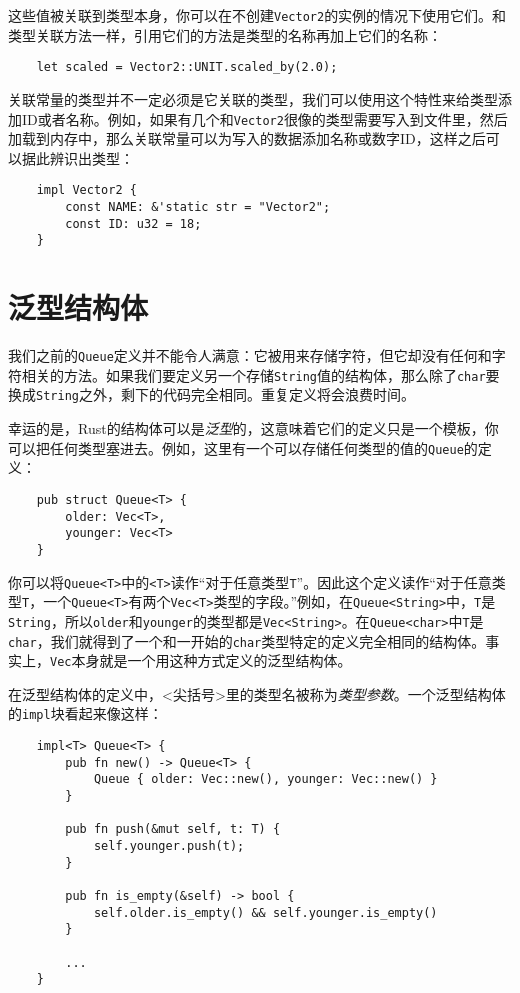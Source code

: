 这些值被关联到类型本身，你可以在不创建\texttt{Vector2}的实例的情况下使用它们。和类型关联方法一样，引用它们的方法是类型的名称再加上它们的名称：
\begin{verbatim}
    let scaled = Vector2::UNIT.scaled_by(2.0);
\end{verbatim}

关联常量的类型并不一定必须是它关联的类型，我们可以使用这个特性来给类型添加ID或者名称。例如，如果有几个和\texttt{Vector2}很像的类型需要写入到文件里，然后加载到内存中，那么关联常量可以为写入的数据添加名称或数字ID，这样之后可以据此辨识出类型：
\begin{verbatim}
    impl Vector2 {
        const NAME: &'static str = "Vector2";
        const ID: u32 = 18;
    }
\end{verbatim}

\section{泛型结构体}\label{GenStruct}

我们之前的\texttt{Queue}定义并不能令人满意：它被用来存储字符，但它却没有任何和字符相关的方法。如果我们要定义另一个存储\texttt{String}值的结构体，那么除了\texttt{char}要换成\texttt{String}之外，剩下的代码完全相同。重复定义将会浪费时间。

幸运的是，Rust的结构体可以是\emph{泛型}的，这意味着它们的定义只是一个模板，你可以把任何类型塞进去。例如，这里有一个可以存储任何类型的值的\texttt{Queue}的定义：
\begin{verbatim}
    pub struct Queue<T> {
        older: Vec<T>,
        younger: Vec<T>
    }
\end{verbatim}

你可以将\texttt{Queue<T>}中的\texttt{<T>}读作“对于任意类型\texttt{T}”。因此这个定义读作“对于任意类型\texttt{T}，一个\texttt{Queue<T>}有两个\texttt{Vec<T>}类型的字段。”例如，在\texttt{Queue<String>}中，\texttt{T}是\texttt{String}，所以\texttt{older}和\texttt{younger}的类型都是\texttt{Vec<String>}。在\texttt{Queue<char>}中\texttt{T}是\texttt{char}，我们就得到了一个和一开始的\texttt{char}类型特定的定义完全相同的结构体。事实上，\texttt{Vec}本身就是一个用这种方式定义的泛型结构体。

在泛型结构体的定义中，<尖括号>里的类型名被称为\emph{类型参数}。一个泛型结构体的\texttt{impl}块看起来像这样：
\begin{verbatim}
    impl<T> Queue<T> {
        pub fn new() -> Queue<T> {
            Queue { older: Vec::new(), younger: Vec::new() }
        }

        pub fn push(&mut self, t: T) {
            self.younger.push(t);
        }

        pub fn is_empty(&self) -> bool {
            self.older.is_empty() && self.younger.is_empty()
        }

        ...
    }
\end{verbatim}

